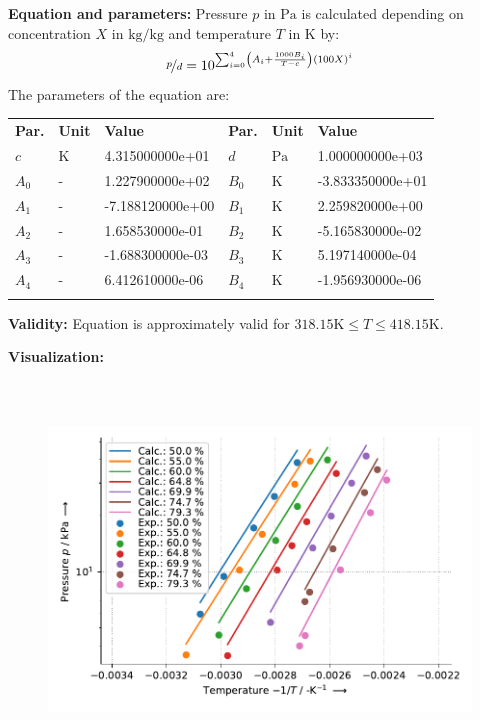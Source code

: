 \textbf{Equation and parameters:}
\newline
%
Pressure $p$ in $\si{\pascal}$ is calculated depending on concentration $X$ in $\si{\kilogram\per\kilogram}$ and  temperature $T$ in $\si{\kelvin}$ by:
%
\begin{equation*}
\nicefrac{p}{d} = 10 ^ { \sum_{i=0}^{4} \left( A_i + \frac{1000 B_i}{T - c} \right) \left( 100 X \right) ^{i}}
\end{equation*}
%
The parameters of the equation are:
%
\begin{longtable}[l]{lll|lll}
\toprule
\addlinespace
\textbf{Par.} & \textbf{Unit} & \textbf{Value} &	\textbf{Par.} & \textbf{Unit} & \textbf{Value} \\
\addlinespace
\midrule
\endhead

\bottomrule
\endfoot
\bottomrule
\endlastfoot
\addlinespace

$c$ & $\si{\kelvin}$ & 4.315000000e+01 & $d$ & $\si{\pascal}$ & 1.000000000e+03 \\
$A_0$ & - & 1.227900000e+02 & $B_0$ & $\si{\kelvin}$ & -3.833350000e+01 \\
$A_1$ & - & -7.188120000e+00 & $B_1$ & $\si{\kelvin}$ & 2.259820000e+00 \\
$A_2$ & - & 1.658530000e-01 & $B_2$ & $\si{\kelvin}$ & -5.165830000e-02 \\
$A_3$ & - & -1.688300000e-03 & $B_3$ & $\si{\kelvin}$ & 5.197140000e-04 \\
$A_4$ & - & 6.412610000e-06 & $B_4$ & $\si{\kelvin}$ & -1.956930000e-06 \\

\addlinespace\end{longtable}

\textbf{Validity:}
\newline
Equation is approximately valid for $318.15 \si{\kelvin} \leq T \leq 418.15 \si{\kelvin}$.
\newline

\textbf{Visualization:}
%
\begin{figure}[!htp]
{\noindent\includegraphics[height=10cm, keepaspectratio]{figs/abs/abs_Water_LiBr_H2N(CH2)2OH__ratio_3_5_1_Antoine_1.pdf}}
\end{figure}
%

